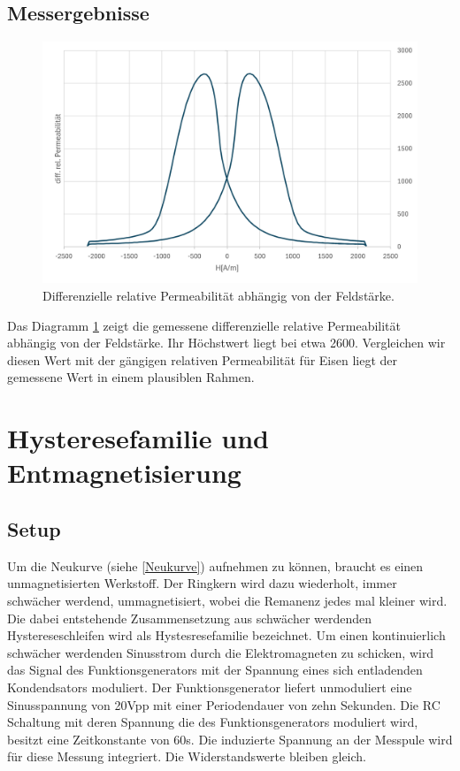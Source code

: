 \documentclass[a4paper,twoside,12pt,DIV=13,BCOR=5mm,numbers=noenddot,cleardoublepage=empty]{scrbook}
\begin{document}
        \subsection{Messergebnisse}
        \begin{figure}
          \centering
          \includegraphics[width=0.9\linewidth]{pictures/Permeabilitaet.png}
          \caption{Differenzielle relative Permeabilit\"at abh\"angig von der Feldst\"arke.}
          \label{fig:perm}
        \end{figure}
        Das Diagramm \ref{fig:perm} zeigt die gemessene differenzielle relative Permeabilit\"at abh\"angig von der Feldst\"arke. Ihr H\"ochstwert liegt bei etwa 2600. 
        Vergleichen wir diesen Wert mit der g\"angigen relativen Permeabilit\"at f\"ur Eisen liegt der gemessene Wert in einem plausiblen Rahmen.
        
        \section{Hysteresefamilie und Entmagnetisierung}
        \label{Entmag}
        \subsection{Setup}
        Um die Neukurve (siehe \ref{Neukurve}) aufnehmen zu k\"onnen, braucht es einen unmagnetisierten Werkstoff. 
        Der Ringkern wird dazu wiederholt, immer schw\"acher werdend, ummagnetisiert, wobei die Remanenz jedes mal kleiner wird.
        Die dabei entstehende Zusammensetzung aus schw\"acher werdenden Hystereseschleifen wird als Hystesresefamilie bezeichnet. 
        Um einen kontinuierlich schw\"acher werdenden Sinusstrom durch die Elektromagneten zu schicken, wird das Signal des Funktionsgenerators 
        mit der Spannung eines sich entladenden Kondendsators moduliert. Der Funktionsgenerator liefert unmoduliert eine Sinusspannung von 20Vpp mit einer Periodendauer von zehn Sekunden.
        Die RC Schaltung mit deren Spannung die des Funktionsgenerators moduliert wird, besitzt eine Zeitkonstante von 60s. Die induzierte Spannung an der Messpule wird f\"ur diese Messung integriert. 
        Die Widerstandswerte bleiben gleich.
\end{document}
